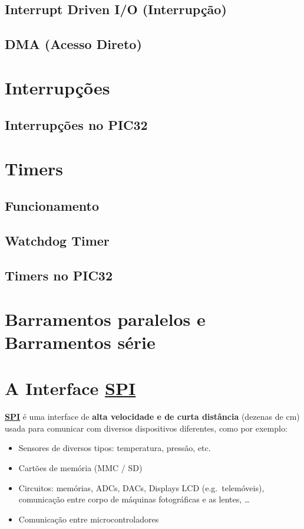 \documentclass[a4paper, 12pt, onecolumn, oneside]{scrartcl}
\begin{document}
\subsection{Interrupt Driven I/O (Interrupção)}
\subsection{DMA (Acesso Direto)}

\section{Interrupções}
\subsection{Interrupções no PIC32}

\section{Timers}
\subsection{Funcionamento}
\subsection{Watchdog Timer}
\subsection{Timers no PIC32}

\section{Barramentos paralelos e Barramentos série}

\section{A Interface \hyperref[spi]{\textbf{\large{SPI}}}}
\hyperref[spi]{\textbf{SPI}} é uma interface de \textbf{alta velocidade e de curta distância} (dezenas de cm) usada para comunicar com
diversos dispositivos diferentes, como por exemplo:
\begin{itemize}
    \item Sensores de diversos tipos: temperatura, pressão, etc.
    \item Cartões de memória (MMC / SD)
    \item Circuitos: memórias, ADCs, DACs, Displays LCD (e.g.\ telemóveis),
    comunicação entre corpo de máquinas fotográficas e as lentes, \ldots
    \item Comunicação entre microcontroladores
\end{itemize}
\end{document}
